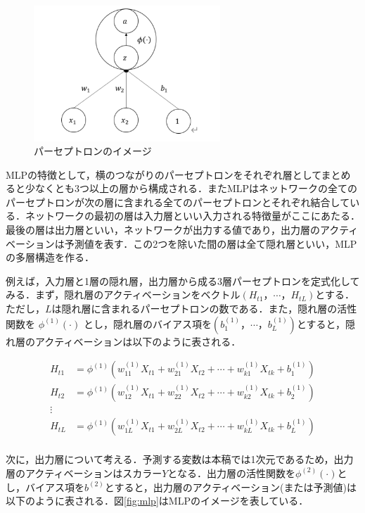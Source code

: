 \documentclass[a4paper，12pt]{jsarticle}
\begin{document}
\begin{figure}
  \centering
  \caption{パーセプトロンのイメージ}
  \label{fig:perceptron}
  \includegraphics[width=7cm]{./img/_ann_unit.png}
\end{figure}

MLPの特徴として，横のつながりのパーセプトロンをそれぞれ層としてまとめると少なくとも3つ以上の層から構成される．またMLPはネットワークの全てのパーセプトロンが次の層に含まれる全てのパーセプトロンとそれぞれ結合している．ネットワークの最初の層は入力層といい入力される特徴量がここにあたる．最後の層は出力層といい，ネットワークが出力する値であり，出力層のアクティベーションは予測値を表す．この2つを除いた間の層は全て隠れ層といい，MLPの多層構造を作る．

例えば，入力層と1層の隠れ層，出力層から成る3層パーセプトロンを定式化してみる．まず，隠れ層のアクティベーションをベクトル$(H_{t1}，\cdots，H_{tL})$とする．ただし，$L$は隠れ層に含まれるパーセプトロンの数である．また，隠れ層の活性関数を $\phi^{(1)}(\cdot)$ とし，隠れ層のバイアス項を$(b^{(1)}_1，\cdots，b^{(1)}_L)$とすると，隠れ層のアクティベーションは以下のように表される．

\begin{equation}
  \begin{split}
    H_{t1} &= \phi^{(1)} \left( w^{(1)}_{11} X_{t1} + w^{(1)}_{21} X_{t2} + \cdots + w^{(1)}_{k1} X_{tk} + b^{(1)}_1 \right) \\
    H_{t2} &= \phi^{(1)} \left( w^{(1)}_{12} X_{t1} + w^{(1)}_{22} X_{t2} + \cdots + w^{(1)}_{k2} X_{tk} + b^{(1)}_2 \right) \\
    \vdots \\
    H_{tL} &= \phi^{(1)} \left( w^{(1)}_{1L} X_{t1} + w^{(1)}_{2L} X_{t2} + \cdots + w^{(1)}_{kL} X_{tk} + b^{(1)}_L \right) \\
  \end{split}
\end{equation}

 次に，出力層について考える．予測する変数は本稿では1次元であるため，出力層のアクティベーションはスカラー$Y$となる．出力層の活性関数を$\phi^{(2)}(\cdot)$とし，バイアス項を$b^{(2)}$とすると，出力層のアクティベーション(または予測値)は以下のように表される．図\ref{fig:mlp}はMLPのイメージを表している．
\end{document}

